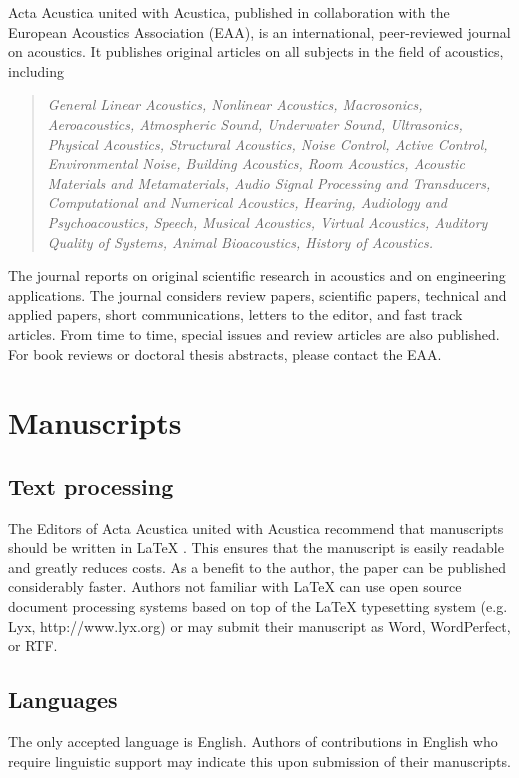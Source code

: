 \documentclass[twocolumn]{article}
\begin{document}
Acta Acustica united with Acustica, published in collaboration with the
European Acoustics Association (EAA), is an international, peer-reviewed
journal on acoustics. It publishes original articles on all subjects in
the field of acoustics, including
\begin{quote}
\em General Linear Acoustics, Nonlinear Acoustics, Macrosonics,
Aeroacoustics, Atmospheric Sound, Underwater Sound, Ultrasonics,
Physical Acoustics, Structural Acoustics, Noise Control, Active Control,
Environmental Noise, Building Acoustics, Room Acoustics, Acoustic
Materials and Metamaterials, Audio Signal Processing and Transducers,
Computational and Numerical Acoustics, Hearing, Audiology and
Psychoacoustics, Speech, Musical Acoustics, Virtual Acoustics, Auditory
Quality of Systems, Animal Bioacoustics, History of Acoustics.
\end{quote}
The journal reports on original scientific research in acoustics and on
engineering applications. The journal considers review papers,
scientific papers, technical and applied papers, short communications,
letters to the editor, and fast track articles. From time to time,
special issues and review articles are also published. For book reviews
or doctoral thesis abstracts, please contact the EAA.


\section{Manuscripts}

\subsection{Text processing}

The Editors of Acta Acustica united with Acustica recommend that
manuscripts should be written in \LaTeX{} \cite{1,2}. This ensures that
the manuscript is easily readable and greatly reduces costs. As a
benefit to the author, the paper can be published considerably faster.
Authors not familiar with \LaTeX{} can use open source document
processing systems based on top of the LaTeX typesetting system (e.g.
Lyx, http://www.lyx.org) or may submit their manuscript as Word,
WordPerfect, or RTF.

\subsection{Languages}

The only accepted language is English. Authors of contributions in
English who require linguistic support may indicate this upon submission
of their manuscripts.
\end{document}
